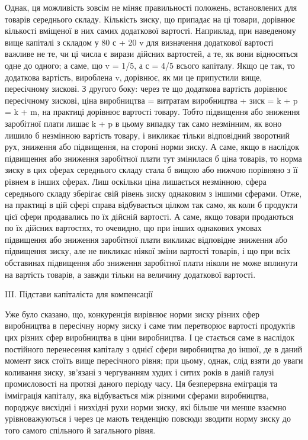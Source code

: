         Однак, ця можливість зовсім не міняє правильності положень, встановлених для товарів
середнього складу. Кількість зиску, що припадає на ці товари, дорівнює кількості вміщеної в них
самих додаткової вартості. Наприклад, при наведеному вище капіталі з складом у 80 с + 20 v для
визначення додаткової вартості важливе не те, чи ці числа є вирази дійсних вартостей, а те, як вони
відносяться одне до одного; а саме, що v = 1/5, а с = 4/5  всього капіталу. Якщо це так, то
додаткова вартість, вироблена v, дорівнює, як ми це припустили вище, пересічному зискові. З другого
боку: через те що додаткова вартість дорівнює пересічному зискові, ціна виробництва = витратам
виробництва + зиск = k + p = k + m, на практиці дорівнює вартості товару. Тобто підвищення або
зниження заробітної плати лишає k + p  в цьому випадку так само незмінним, як воно лишило б
незмінною вартість товару, і викликає тільки відповідний зворотний рух,
зниження або підвищення, на стороні норми зиску. А саме, якщо в наслідок підвищення або зниження
заробітної плати тут змінилася б ціна товарів, то норма зиску в цих сферах середнього складу стала б
вищою або нижчою порівняно з її рівнем в інших
сферах. Лиш оскільки ціна лишається незмінною, сфера
середнього складу зберігає свій рівень зиску однаковим з іншими сферами. Отже, на практиці в цій
сфері справа відбувається цілком так само, як коли б продукти цієї сфери продавались по їх дійсній
вартості. А саме, якщо товари продаються по їх дійсних вартостях, то очевидно, що при інших
однакових
 умовах підвищення або зниження заробітної плати викликає відповідне зниження або підвищення зиску,
але не викликає ніякої зміни вартості товарів, і що при всіх обставинах підвищення або зниження
заробітної плати ніколи не може вплинути на вартість товарів, а завжди тільки на величину додаткової
вартості.

        III. Підстави капіталіста для компенсації

Уже було сказано, що, конкуренція вирівнює норми зиску різних сфер виробництва в пересічну норму
зиску і саме тим перетворює вартості продуктів цих різних сфер виробництва в ціни виробництва. І це
стається саме в наслідок постійного перенесення капіталу з однієї сфери виробництва до іншої, де в
даний момент зиск стоїть вище пересічного рівня; при цьому, однак, слід взяти до уваги коливання
зиску, зв’язані з чергуванням худих і ситих років в даній галузі промисловості на протязі даного
періоду часу. Ця безперервна еміграція та імміграція капіталу, яка відбувається між різними сферами
виробництва, породжує висхідні і низхідні рухи норми зиску, які більше чи менше взаємно
урівноважуються і через це мають тенденцію
повсюди зводити норму зиску до того самого спільного й загального рівня.

